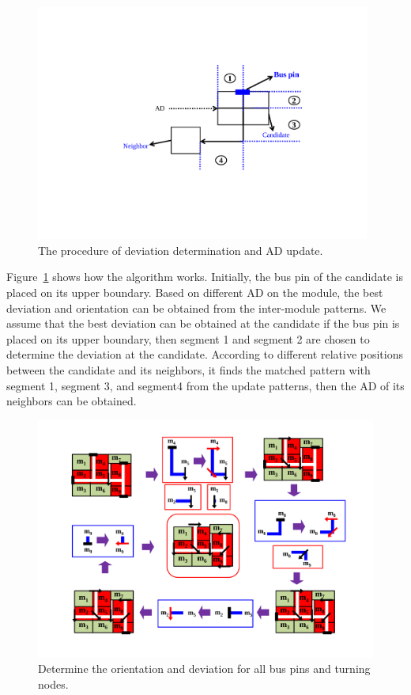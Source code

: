 \begin{figure}[htb]
  \centering
    \includegraphics[width=11cm]{Fig/deviation_calculation.pdf}
     \caption{
      The procedure of deviation determination and AD update.
   }
  \label{fig::deviation_calculation}
\end{figure}

Figure~\ref{fig::deviation_calculation} shows how the algorithm works.
Initially, the bus pin of the candidate is placed on its upper boundary.
Based on different AD on the module, the best deviation and orientation can be obtained from the inter-module patterns.
We assume that the best deviation can be obtained at the candidate if the bus pin is placed on its upper boundary,
then segment 1 and segment 2 are chosen to determine the deviation at the candidate.
According to different relative positions between the candidate and its neighbors,
it finds the matched pattern with segment 1, segment 3, and segment4 from the update patterns,
then the AD of its neighbors can be obtained.

\begin{figure}[htb]
  \centering
    \includegraphics[width=13cm]{Fig/deviation_example2.pdf}
     \caption{
      Determine the orientation and deviation for all bus pins and turning nodes.
   }
  \label{fig::deviation_example2}
\end{figure}

